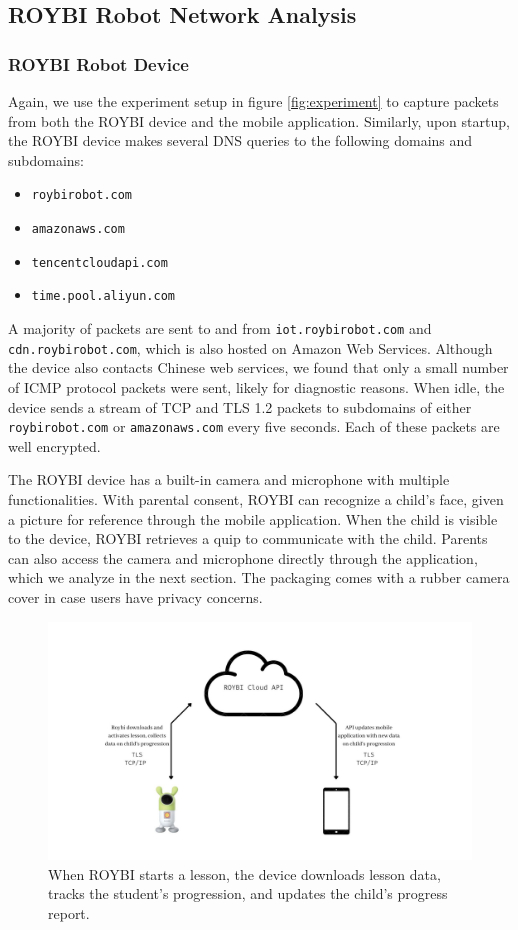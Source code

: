 \documentclass[12pt]{ucthesis}
\begin{document}
\subsection{ROYBI Robot Network Analysis}

\subsubsection{ROYBI Robot Device}
Again, we use the experiment setup in figure \ref{fig:experiment} to capture packets from both the ROYBI device and the mobile application. Similarly, upon startup, the ROYBI device makes several DNS queries to the following domains and subdomains:

\begin{itemize}
\item \texttt{roybirobot.com}
\item \texttt{amazonaws.com}
\item \texttt{tencentcloudapi.com}
\item \texttt{time.pool.aliyun.com}
\end{itemize}

A majority of packets are sent to and from \texttt{iot.roybirobot.com} and \texttt{cdn.roybirobot.com}, which is also hosted on Amazon Web Services. Although the device also contacts Chinese web services, we found that only a small number of ICMP protocol packets were sent, likely for diagnostic reasons. When idle, the device sends a stream of TCP and TLS 1.2 packets to subdomains of either \texttt{roybirobot.com} or \texttt{amazonaws.com} every five seconds. Each of these packets are well encrypted.

The ROYBI device has a built-in camera and microphone with multiple functionalities. With parental consent, ROYBI can recognize a child's face, given a picture for reference through the mobile application. When the child is visible to the device, ROYBI retrieves a quip to communicate with the child. Parents can also access the camera and microphone directly through the application, which we analyze in the next section. The packaging comes with a rubber camera cover in case users have privacy concerns. 

\begin{figure}
    \includegraphics[width=\textwidth]{lesson.jpg}
    \caption{When ROYBI starts a lesson, the device downloads lesson data, tracks the student's progression, and updates the child's progress report.}
    \label{fig:lesson}
\end{figure}
\end{document}
